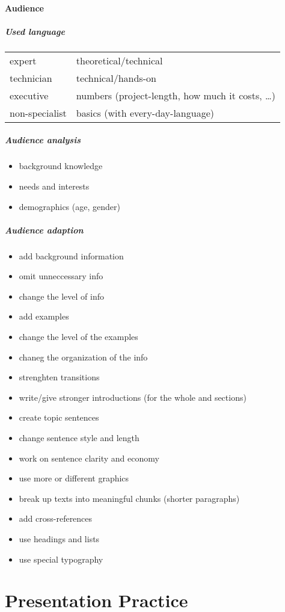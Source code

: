 \paragraph{Audience}
\subparagraph{Used language} \parskp
\begin{tabular}{l l}
expert & theoretical/technical\\
technician & technical/hands-on\\
executive & numbers (project-length, how much it costs, …)\\
non-specialist & basics (with every-day-language)
\end{tabular}

\subparagraph{Audience analysis}
\begin{itemize}
\item background knowledge
\item needs and interests
\item demographics (age, gender)
\end{itemize}

\subparagraph{Audience adaption}
\begin{itemize}
\item add background information
\item omit unneccessary info
\item change the level of info
\item add examples
\item change the level of the examples
\item chaneg the organization of the info
\item strenghten transitions
\item write/give stronger introductions (for the whole and sections)
\item create topic sentences
\item change sentence style and length
\item work on sentence clarity and economy
\item use more or different graphics
\item break up texts into meaningful chunks (shorter paragraphs)
\item add cross-references
\item use headings and lists
\item use special typography
\end{itemize}

\section{Presentation Practice}

